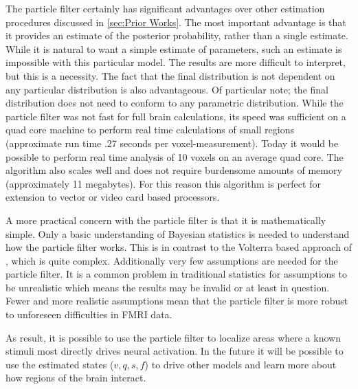 The particle filter certainly has significant advantages over other estimation procedures
discussed in \autoref{sec:Prior Works}. The most important advantage is that it provides
an estimate of the posterior probability, rather than a single estimate. While it is natural
to want a simple estimate of parameters, such an estimate is impossible with this particular
model. The results are more difficult to interpret, but this is a necessity. The fact that 
the final distribution is not dependent on any particular distribution is also advantageous.
Of particular note; the final distribution does not need to conform to any parametric
distribution. While the particle filter was not fast for full brain calculations, its speed
was sufficient on a quad core machine to perform real time calculations of small regions
(approximate run time .27 seconds per voxel-measurement). Today it would be possible
 to perform real time analysis of 10 voxels on an average quad core. The algorithm also scales
well and does not require burdensome amounts of memory (approximately 11 megabytes). 
For this reason this algorithm is perfect for extension to vector or video card
based processors. 

A more practical concern with the particle filter is that it is mathematically
simple. Only a basic understanding of Bayesian statistics is needed to understand
how the particle filter works. This is in contrast to the Volterra based approach
of \cite{Friston2000}, which is quite complex. Additionally very few assumptions
are needed for the particle filter. It is a common problem in traditional statistics 
for assumptions to be unrealistic which means the results may be invalid or at 
least in question. 
Fewer and more realistic assumptions mean that the particle filter is more robust
to unforeseen difficulties in FMRI data. 



As result, it is possible to use
the particle filter to localize areas where a known stimuli most directly drives
neural activation. In the future it will be possible to use the estimated states
($v,q,s,f$) to drive other models and learn more about how regions of the brain
interact. 

